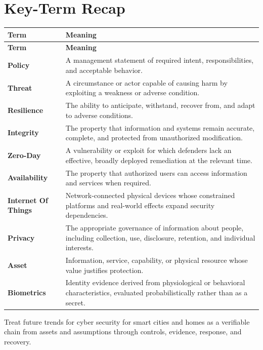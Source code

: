 \documentclass[11pt]{article}
\begin{document}
\section*{Key-Term Recap}
\begin{longtable}{>{\RaggedRight\arraybackslash}p{}>{\RaggedRight\arraybackslash}p{}}
\toprule\rowcolor{Navy}\color{white}\textbf{Term} & \color{white}\textbf{Meaning}\\\midrule
\endfirsthead
\toprule\rowcolor{Navy}\color{white}\textbf{Term} & \color{white}\textbf{Meaning}\\\midrule
\endhead
\textbf{Policy} & A management statement of required intent, responsibilities, and acceptable behavior. \\\midrule
\textbf{Threat} & A circumstance or actor capable of causing harm by exploiting a weakness or adverse condition. \\\midrule
\textbf{Resilience} & The ability to anticipate, withstand, recover from, and adapt to adverse conditions. \\\midrule
\textbf{Integrity} & The property that information and systems remain accurate, complete, and protected from unauthorized modification. \\\midrule
\textbf{Zero-Day} & A vulnerability or exploit for which defenders lack an effective, broadly deployed remediation at the relevant time. \\\midrule
\textbf{Availability} & The property that authorized users can access information and services when required. \\\midrule
\textbf{Internet Of Things} & Network-connected physical devices whose constrained platforms and real-world effects expand security dependencies. \\\midrule
\textbf{Privacy} & The appropriate governance of information about people, including collection, use, disclosure, retention, and individual interests. \\\midrule
\textbf{Asset} & Information, service, capability, or physical resource whose value justifies protection. \\\midrule
\textbf{Biometrics} & Identity evidence derived from physiological or behavioral characteristics, evaluated probabilistically rather than as a secret. \\\midrule
\bottomrule
\end{longtable}
\begin{takeawaybox}
Treat future trends for cyber security for smart cities and homes as a verifiable chain from assets and assumptions through controls, evidence, response, and recovery.
\end{takeawaybox}
\end{document}
